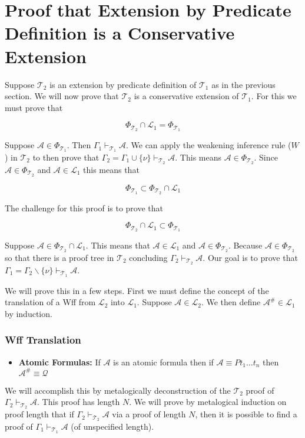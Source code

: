 \documentclass[12pt]{article}
\theoremstyle{break}
\theoremstyle{break}
\theoremstyle{break}
\theoremstyle{break}
\newcommand{\mc}[1]{\mathcal{#1}}
\begin{document}
\section{Proof that Extension by Predicate Definition is a Conservative Extension}

Suppose $\mc{T}_2$ is an extension by predicate definition of $\mc{T}_1$ as in the previous section.
We will now prove that $\mc{T}_2$ is a conservative extension of $\mc{T}_1$.
For this we must prove that

$$
\Phi_{\mc{T}_2} \cap \mc{L}_1 = \Phi_{\mc{T}_1}
$$

Suppose $\mc{A} \in \Phi_{\mc{T}_1}$.
Then $\Gamma_1 \vdash_{\mc{T}_1} \mc{A}$.
We can apply the weakening inference rule ($W$) in $\mc{T}_2$ to then prove that $\Gamma_2 = \Gamma_1 \cup \{\nu\} \vdash_{\mc{T}_2} \mc{A}$.
This means $\mc{A} \in \Phi_{\mc{T}_2}$.
Since $\mc{A} \in \Phi_{\mc{T}_2}$ and $\mc{A} \in \mc{L}_1$ this means that

$$
\Phi_{\mc{T}_1} \subset \Phi_{\mc{T}_2} \cap \mc{L}_1
$$

The challenge for this proof is to prove that 

$$
\Phi_{\mc{T}_2} \cap \mc{L}_1 \subset \Phi_{\mc{T}_1}
$$

Suppose $\mc{A} \in \Phi_{\mc{T}_2} \cap \mc{L}_1$.
This means that $\mc{A} \in \mc{L}_1$ and $\mc{A} \in \Phi_{\mc{T}_2}$.
Because $\mc{A} \in \Phi_{\mc{T}_2}$ so that there is a proof tree in $\mc{T}_2$ concluding $\Gamma_2 \vdash_{\mc{T}_2} \mc{A}$.
Our goal is to prove that $\Gamma_1 = \Gamma_2 \backslash \{\nu\} \vdash_{\mc{T}_1} \mc{A}$.

We will prove this in a few steps.
First we must define the concept of the translation of a Wff from $\mc{L}_2$ into $\mc{L}_1$.
Suppose $\mc{A} \in \mc{L}_2$. 
We then define $\mc{A}^\# \in \mc{L}_1$ by induction.

\hrulefill
\subsubsection*{Wff Translation}
\begin{itemize}
\item{\textbf{Atomic Formulas:} If $\mc{A}$ is an atomic formula then if $\mc{A} \equiv Pt_1\ldots t_n$ then $\mc{A}^\# \equiv \mc{Q}$}
\end{itemize}
\hrulefill


We will accomplish this by metalogically deconstruction of the $\mc{T}_2$ proof of $\Gamma_2 \vdash_{\mc{T}_2} \mc{A}$.
This proof has length $N$.
We will prove by metalogical induction on proof length that if $\Gamma_2 \vdash_{\mc{T}_2} \mc{A}$ via a proof of length $N$, then it is possible to find a proof of $\Gamma_1 \vdash_{\mc{T}_1} \mc{A}$ (of unspecified length).
\end{document}
